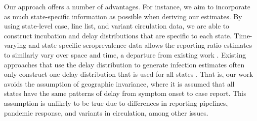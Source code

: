 \documentclass{article}
\begin{document}

Our approach offers a number of advantages.
For instance, we aim to incorporate as much state-specific information as
possible when deriving our estimates. By using state-level case, line list, and
variant circulation data, we are able to construct incubation and delay
distributions that are specific to each state. Time-varying and state-specific
seroprevalence data allows the reporting ratio estimates to similarly vary over
space and time, a departure from existing work \citep{unwin2020state,
uga2020covid19}. Existing approaches that use the delay distribution to generate
infection estimates often only construct one delay distribution that is used for
all states \citep{chitwood2022reconstructing, jahja2022real}. That is, our work
avoids the assumption of geographic invariance, where it is assumed that
all states have the same patterns of delay from symptom onset to case report.
This assumption is
unlikely to be true due to differences in reporting pipelines, pandemic
response, and variants in circulation, among other issues. 
\end{document}
